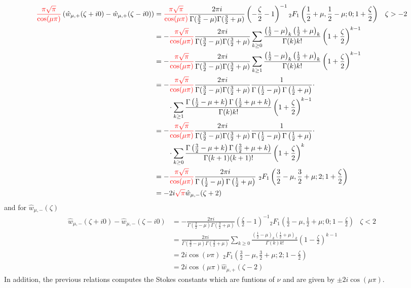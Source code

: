 \documentclass{article}
\begin{document}
\begin{align*}
\textcolor{red}{\frac{\pi\sqrt{\pi}}{\cos(\mu \pi)}}\left(\hat{w}_{\mu,+}(\zeta+i0)-\hat{w}_{\mu,+}(\zeta-i0)\right)&=\textcolor{red}{\frac{\pi\sqrt{\pi}}{\cos(\mu \pi)}}\frac{2\pi i}{\Gamma(\tfrac{3}{2}-\mu)\Gamma(\tfrac{3}{2}+\mu)}\left(-\frac{\zeta}{2}-1\right)^{-1}{}_2F_1\left(\frac{1}{2}+\mu,\frac{1}{2}-\mu;0;1+\frac{\zeta}{2}\right) & \zeta>-2 \\
&=-\textcolor{red}{\frac{\pi\sqrt{\pi}}{\cos(\mu \pi)}}\frac{2\pi i}{\Gamma(\tfrac{3}{2}-\mu)\Gamma(\tfrac{3}{2}+\mu)}\sum_{k\geq 0}\frac{\left(\tfrac{1}{2}-\mu\right)_k\left(\tfrac{1}{2}+\mu\right)_k}{\Gamma(k)k!}\left(1+\frac{\zeta}{2}\right)^{k-1} & \\
&=-\textcolor{red}{\frac{\pi\sqrt{\pi}}{\cos(\mu \pi)}}\frac{2\pi i}{\Gamma(\tfrac{3}{2}-\mu)\Gamma(\tfrac{3}{2}+\mu)}\sum_{k\geq 1}\frac{\left(\tfrac{1}{2}-\mu\right)_k\left(\tfrac{1}{2}+\mu\right)_k}{\Gamma(k)k!}\left(1+\frac{\zeta}{2}\right)^{k-1} & \\
&=-\textcolor{red}{\frac{\pi\sqrt{\pi}}{\cos(\mu \pi)}}\frac{2\pi i}{\Gamma(\tfrac{3}{2}-\mu)\Gamma(\tfrac{3}{2}+\mu)}\frac{1}{\Gamma\left(\frac{1}{2}-\mu\right)\Gamma\left(\frac{1}{2}+\mu\right)}\cdot\\
& \qquad\cdot \sum_{k\geq 1}\frac{\Gamma\left(\tfrac{1}{2}-\mu+k\right)\Gamma\left(\tfrac{1}{2}+\mu+k\right)}{\Gamma(k)k!}\left(1+\frac{\zeta}{2}\right)^{k-1} & \\
&=-\textcolor{red}{\frac{\pi\sqrt{\pi}}{\cos(\mu \pi)}}\frac{2\pi i}{\Gamma(\tfrac{3}{2}-\mu)\Gamma(\tfrac{3}{2}+\mu)}\frac{1}{\Gamma\left(\frac{1}{2}-\mu\right)\Gamma\left(\frac{1}{2}+\mu\right)}\cdot \\
&\qquad\cdot \sum_{k\geq 0}\frac{\Gamma\left(\tfrac{3}{2}-\mu+k\right)\Gamma\left(\tfrac{3}{2}+\mu+k\right)}{\Gamma(k+1)(k+1)!}\left(1+\frac{\zeta}{2}\right)^{k} & \\
&=-\textcolor{red}{\frac{\pi\sqrt{\pi}}{\cos(\mu \pi)}}\frac{2\pi i}{\Gamma\left(\frac{1}{2}-\mu\right)\Gamma\left(\frac{1}{2}+\mu\right)}\,\, {}_2F_1\left(\frac{3}{2}-\mu,\frac{3}{2}+\mu;2;1+\frac{\zeta}{2}\right) & \\
&=-2i\textcolor{red}{\sqrt{\pi}}\hat{w}_{\mu,-}(\zeta+2)
\end{align*} 
and for $\hat{w}_{\mu,-}(\zeta)$
\begin{align*}
\hat{w}_{\mu,-}(\zeta+i0)-\hat{w}_{\mu,-}(\zeta-i0)&=-\frac{2\pi i}{\Gamma(\tfrac{3}{2}-\mu)\Gamma(\tfrac{3}{2}+\mu)}\left(\frac{\zeta}{2}-1\right)^{-1}{}_2F_1\left(\frac{1}{2}-\mu,\frac{1}{2}+\mu;0;1-\frac{\zeta}{2}\right) & \zeta<2 \\
&=\frac{2\pi i}{\Gamma(\tfrac{3}{2}-\mu)\Gamma(\tfrac{3}{2}+\mu)}\sum_{k\geq 0}\frac{\left(\tfrac{1}{2}-\mu\right)_k\left(\tfrac{1}{2}+\mu\right)_k}{\Gamma(k)k!}\left(1-\frac{\zeta}{2}\right)^{k-1} & \\
&=2i\cos(\nu \pi)\,\, {}_2F_1\left(\frac{3}{2}-\mu,\frac{3}{2}+\mu;2;1-\frac{\zeta}{2}\right) & \\
&=2i\cos(\mu \pi)\hat{w}_{\mu,+}(\zeta-2)
\end{align*}
In addition, the previous relations computes the Stokes constants which are funtions of $\nu$ and are given by $\pm 2i\cos(\mu\pi)$.
\end{document}
